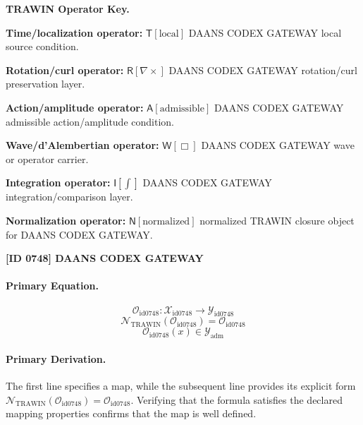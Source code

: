 \par\vspace{0.45\baselineskip}
\noindent\begin{minipage}[t]{\linewidth}
\begingroup
\small
\raggedright
\textbf{TRAWIN Operator Key.}\par
\noindent\textbf{Time/localization operator:} $\mathsf{T}\!\left[\mathrm{local}\right]$ DAANS CODEX GATEWAY local source condition.\par
\noindent\textbf{Rotation/curl operator:} $\mathsf{R}\!\left[\nabla\times\right]$ DAANS CODEX GATEWAY rotation/curl preservation layer.\par
\noindent\textbf{Action/amplitude operator:} $\mathsf{A}\!\left[\mathrm{admissible}\right]$ DAANS CODEX GATEWAY admissible action/amplitude condition.\par
\noindent\textbf{Wave/d'Alembertian operator:} $\mathsf{W}\!\left[\Box\right]$ DAANS CODEX GATEWAY wave or operator carrier.\par
\noindent\textbf{Integration operator:} $\mathsf{I}\!\left[\int\right]$ DAANS CODEX GATEWAY integration/comparison layer.\par
\noindent\textbf{Normalization operator:} $\mathsf{N}\!\left[\mathrm{normalized}\right]$ normalized TRAWIN closure object for DAANS CODEX GATEWAY.\par
\endgroup
\end{minipage}

\clearpage
\noindent\textbf{[ID 0748] DAANS CODEX GATEWAY}\par
\vspace{0.35em}
\paragraph{Primary Equation.}
\[
\mathcal{O}_{\mathrm{id0748}}:\mathcal{X}_{\mathrm{id0748}}\longrightarrow\mathcal{Y}_{\mathrm{id0748}}
\]
\[
\mathcal{N}_{\mathrm{TRAWIN}}(\mathcal{O}_{\mathrm{id0748}})=\mathcal{O}_{\mathrm{id0748}}
\]
\[
\mathcal{O}_{\mathrm{id0748}}(x)\in\mathcal{Y}_{\mathrm{adm}}
\]

\paragraph{Primary Derivation.}
The first line specifies a map, while the subsequent line provides its explicit form \( \mathcal{N}_{\mathrm{TRAWIN}}(\mathcal{O}_{\mathrm{id0748}})=\mathcal{O}_{\mathrm{id0748}} \). Verifying that the formula satisfies the declared mapping properties confirms that the map is well defined.

